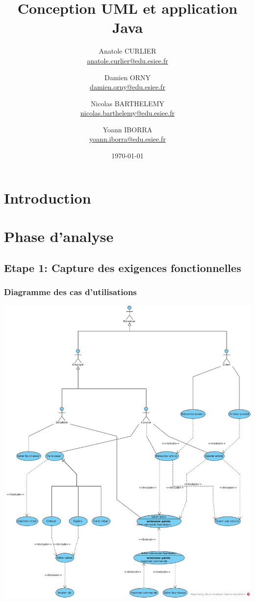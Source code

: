 \documentclass[a4paper,table]{article}
\title{Conception UML  et application Java}
\author{
	Anatole CURLIER \\ \href{mailto:anatole.curlier@edu.esiee.fr}{anatole.curlier@edu.esiee.fr} \and
	Damien ORNY \\ \href{mailto:damien.orny@edu.esiee.fr}{damien.orny@edu.esiee.fr} \and
	Nicolas BARTHELEMY \\ \href{mailto:nicolas.barthelemy@edu.esiee.fr}{nicolas.barthelemy@edu.esiee.fr} \and
	Yoann IBORRA \\ \href{mailto:yoann.iborra@edu.esiee.fr} {yoann.iborra@edu.esiee.fr}
}
\date{\today}
\begin{document}
\maketitle
\newpage
\tableofcontents
\newpage

\section*{Introduction}

\newpage

\section{Phase d'analyse}

\subsection{Etape 1: Capture des exigences fonctionnelles}

\subsubsection{Diagramme des cas d'utilisations}

\includegraphics[width=\textwidth]{images/Use_Case.jpg}
\end{document}
